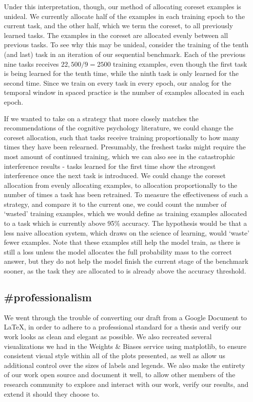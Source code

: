 Under this interpretation, though, our method of allocating coreset examples is unideal. We currently allocate half of the examples in each training epoch to the current task, and the other half, which we term the coreset, to all previously learned tasks. The examples in the coreset are allocated evenly between all previous tasks. To see why this may be unideal, consider the training of the tenth (and last) task in an iteration of our sequential benchmark. Each of the previous nine tasks receives $22,500 / 9 = 2500$ training examples, even though the first task is being learned for the tenth time, while the ninth task is only learned for the second time. Since we train on every task in every epoch, our analog for the temporal window in spaced practice is the number of examples allocated in each epoch. 

If we wanted to take on a strategy that more closely matches the recommendations of the cognitive psychology literature, we could change the coreset allocation, such that tasks receive training proportionally to how many times they have been relearned. Presumably, the freshest tasks might require the most amount of continued training, which we can also see in the catastrophic interference results - tasks learned for the first time show the strongest interference once the next task is introduced. We could change the coreset allocation from evenly allocating examples, to allocation proportionally to the number of times a task has been retrained. To measure the effectiveness of such a strategy, and compare it to the current one, we could count the number of `wasted' training examples, which we would define as training examples allocated to a task which is currently above 95\% accuracy. The hypothesis would be that a less naive allocation system, which draws on the science of learning, would ‘waste' fewer examples. Note that these examples still help the model train, as there is still a loss unless the model allocates the full probability mass to the correct answer, but they do not help the model finish the current stage of the benchmark sooner, as the task they are allocated to is already above the accuracy threshold. 

\subsection{\#professionalism}
We went through the trouble of converting our draft from a Google Document to LaTeX, in order to adhere to a professional standard for a thesis and verify our work looks as clean and elegant as possible. We also recreated several visualizations we had in the Weights \& Biases service using matplotlib, to ensure consistent visual style within all of the plots presented, as well as allow us additional control over the sizes of labels and legends. We also make the entirety of our work open source and document it well, to allow other members of the research community to explore and interact with our work, verify our results, and extend it should they choose to. 

